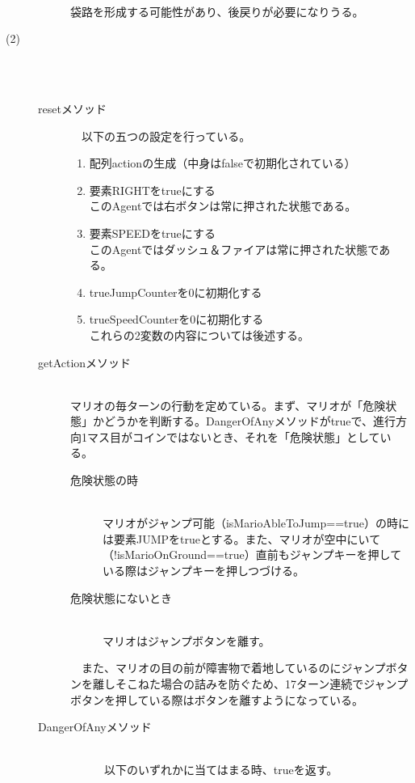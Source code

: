 \documentclass[a4j]{jarticle}
\begin{document}
\begin{description}
\begin{description}
	\\
	袋路を形成する可能性があり、後戻りが必要になりうる。
	\end{description}
\item[(2)]~\\
　\begin{description}
  \item[resetメソッド]
  　以下の五つの設定を行っている。
   \begin{enumerate}
   \item 配列actionの生成（中身はfalseで初期化されている）
   \item 要素RIGHTをtrueにする ~\\
     このAgentでは右ボタンは常に押された状態である。
　 \item 要素SPEEDをtrueにする　~\\
     このAgentではダッシュ＆ファイアは常に押された状態である。
　 \item trueJumpCounterを0に初期化する
   \item trueSpeedCounterを0に初期化する~\\
     これらの2変数の内容については後述する。
   \end{enumerate}
  \item[getActionメソッド]~\\
    マリオの毎ターンの行動を定めている。まず、マリオが「危険状態」かどうかを判断する。DangerOfAnyメソッドがtrueで、進行方向1マス目がコインではないとき、それを「危険状態」としている。
    \begin{description}
    \item[危険状態の時]~\\
      マリオがジャンプ可能（isMarioAbleToJump==true）の時には要素JUMPをtrueとする。また、マリオが空中にいて（!isMarioOnGround==true）直前もジャンプキーを押している際はジャンプキーを押しつづける。
    \item[危険状態にないとき]~\\
      マリオはジャンプボタンを離す。
　  \end{description}
    　また、マリオの目の前が障害物で着地しているのにジャンプボタンを離しそこねた場合の詰みを防ぐため、17ターン連続でジャンプボタンを押している際はボタンを離すようになっている。
　\item[DangerOfAnyメソッド]~\\
　　　以下のいずれかに当てはまる時、trueを返す。
\end{description}
\end{description}
\end{document}
